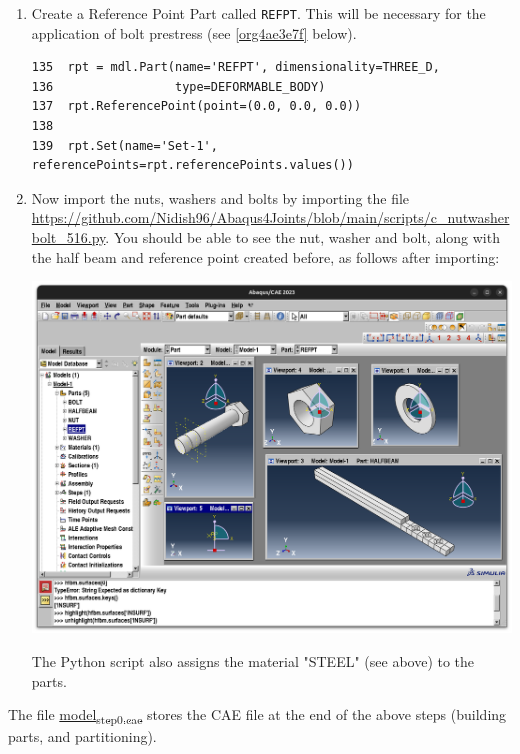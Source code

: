 \documentclass[11pt]{article}
\begin{document}
\begin{enumerate}
\item Create a Reference Point Part called \texttt{REFPT}.
This will be necessary for the application of bolt prestress (see \ref{org4ae3e7f} below).
\begin{verbatim}
135  rpt = mdl.Part(name='REFPT', dimensionality=THREE_D, 
136                 type=DEFORMABLE_BODY)
137  rpt.ReferencePoint(point=(0.0, 0.0, 0.0))
138  
139  rpt.Set(name='Set-1', referencePoints=rpt.referencePoints.values())
\end{verbatim}
\item Now import the nuts, washers and bolts by importing the file \url{https://github.com/Nidish96/Abaqus4Joints/blob/main/scripts/c\_nutwasherbolt\_516.py}.
You should be able to see the nut, washer and bolt, along with the half beam and reference point created before, as follows after importing:
\begin{center}
\includegraphics[width=.9\linewidth]{./figs/nwb.png}
\end{center}
The Python script also assigns the material "STEEL" (see above) to the parts.
\end{enumerate}

The file \href{https://github.com/Nidish96/Abaqus4Joints/blob/main/assets/assembly/model\_step0.cae}{model\textsubscript{step0.cae}} stores the CAE file at the end of the above steps (building parts, and partitioning).
\end{document}
